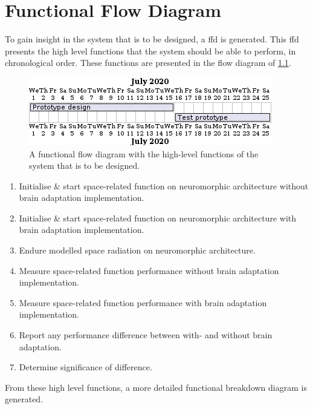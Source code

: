 \chapter{Functional Flow Diagram}\label{chap:baseline_ffd}
To gain insight in the system that is to be designed, a \acrlong{ffd} is generated. This \acrshort{ffd} presents the high level functions that the system should be able to perform, in chronological order. These functions are presented in the flow diagram of \cref{fig:baseline_ffd}. 

\begin{figure}[H]
    \centering
    \includegraphics[width=0.6\linewidth]{latex/Images/Diagrams/trivial_gantt.png}
    \caption{A functional flow diagram with the high-level functions of the system that is to be designed.}
    \label{fig:baseline_ffd}
\end{figure}

\begin{enumerate}
    \item Initialise \& start space-related function on neuromorphic architecture without brain adaptation implementation.
    \item Initialise \& start space-related function on neuromorphic architecture with brain adaptation implementation.
    \item Endure modelled space radiation on neuromorphic architecture.
    \item Measure space-related function performance without brain adaptation implementation.
    \item Measure space-related function performance with brain adaptation implementation.
    \item Report any performance difference between with- and without brain adaptation.
    \item Determine significance of difference.
\end{enumerate}

From these high level functions, a more detailed functional breakdown diagram is generated.

